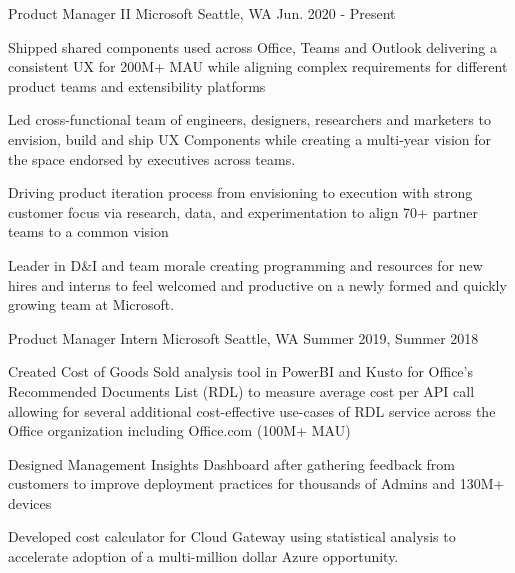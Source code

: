 

\begin{cventries}

  \cventry
    {Product Manager II} %
    {Microsoft} %
    {} %
    {Seattle, WA} %
    {Jun. 2020 - Present} %
    {
      \begin{cvitems} %
        \item {Shipped shared components used across Office, Teams and Outlook delivering a consistent UX for 200M+ MAU while aligning complex requirements for different product teams and extensibility platforms}
        \item{Led cross-functional team of engineers, designers, researchers and marketers to envision, build and ship UX Components while creating a multi-year vision for the space endorsed by executives across teams.}
        \item {Driving product iteration process from envisioning to execution with strong customer focus via research, data, and experimentation to align 70+ partner teams to a common vision}
        \item{Leader in D\&I and team morale creating programming and resources for new hires and interns to feel welcomed and productive on a newly formed and quickly growing team at Microsoft.}
      \end{cvitems}
    }

  \cventry
    {Product Manager Intern} %
    {Microsoft} %
    {} %
    {Seattle, WA} %
    {Summer 2019, Summer 2018} %
    {
      \begin{cvitems} %
        \item {Created Cost of Goods Sold analysis tool in PowerBI and Kusto for Office's Recommended Documents List (RDL) to measure average cost per API call allowing for several additional cost-effective use-cases of RDL service across the Office organization including Office.com (100M+ MAU)}
        \item {Designed Management Insights Dashboard after gathering feedback from customers to improve deployment practices for thousands of Admins and 130M+ devices}
        \item {Developed cost calculator for Cloud Gateway using statistical analysis to accelerate adoption of a multi-million dollar Azure opportunity.}
      \end{cvitems}
    }


\end{cventries}
